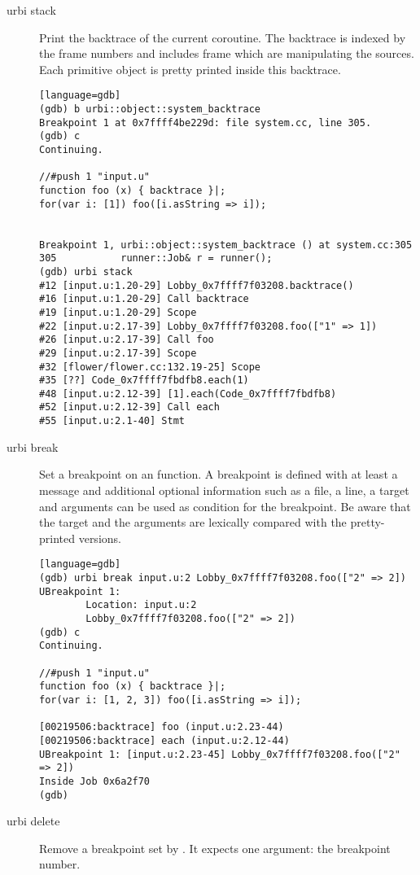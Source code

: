 \begin{description}
\item[urbi stack] Print the backtrace of the current coroutine.  The
  backtrace is indexed by the \Cxx frame numbers and includes frame which
  are manipulating the sources.  Each primitive object is pretty printed
  inside this backtrace.

\begin{verbatim}[language=gdb]
(gdb) b urbi::object::system_backtrace
Breakpoint 1 at 0x7ffff4be229d: file system.cc, line 305.
(gdb) c
Continuing.

//#push 1 "input.u"
function foo (x) { backtrace }|;
for(var i: [1]) foo([i.asString => i]);


Breakpoint 1, urbi::object::system_backtrace () at system.cc:305
305           runner::Job& r = runner();
(gdb) urbi stack
#12 [input.u:1.20-29] Lobby_0x7ffff7f03208.backtrace()
#16 [input.u:1.20-29] Call backtrace
#19 [input.u:1.20-29] Scope
#22 [input.u:2.17-39] Lobby_0x7ffff7f03208.foo(["1" => 1])
#26 [input.u:2.17-39] Call foo
#29 [input.u:2.17-39] Scope
#32 [flower/flower.cc:132.19-25] Scope
#35 [??] Code_0x7ffff7fbdfb8.each(1)
#48 [input.u:2.12-39] [1].each(Code_0x7ffff7fbdfb8)
#52 [input.u:2.12-39] Call each
#55 [input.u:2.1-40] Stmt
\end{verbatim}

\item[urbi break] Set a breakpoint on an \us function.  A breakpoint is
  defined with at least a message and additional optional information such
  as a file, a line, a target and arguments can be used as condition for the
  breakpoint.  Be aware that the target and the arguments are lexically
  compared with the pretty-printed versions.

\begin{verbatim}[language=gdb]
(gdb) urbi break input.u:2 Lobby_0x7ffff7f03208.foo(["2" => 2])
UBreakpoint 1:
        Location: input.u:2
        Lobby_0x7ffff7f03208.foo(["2" => 2])
(gdb) c
Continuing.

//#push 1 "input.u"
function foo (x) { backtrace }|;
for(var i: [1, 2, 3]) foo([i.asString => i]);

[00219506:backtrace] foo (input.u:2.23-44)
[00219506:backtrace] each (input.u:2.12-44)
UBreakpoint 1: [input.u:2.23-45] Lobby_0x7ffff7f03208.foo(["2" => 2])
Inside Job 0x6a2f70
(gdb)
\end{verbatim}


\item[urbi delete] Remove a breakpoint set by .  It
  expects one argument: the \urbi breakpoint number.


\end{description}
